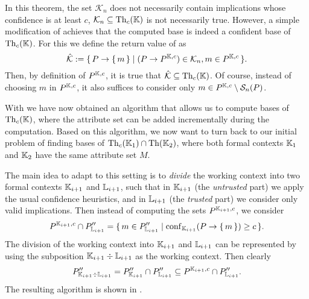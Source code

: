 In this theorem, the set $\mathcal{K}_{n}$ does not necessarily contain implications whose
confidence is at least $c$, \ie $\mathcal{K}_{n} \subseteq \operatorname{Th}_{c}({\mathbb{K}})$ is not
necessarily true.  However, a simple modification of
 achieves that the computed base is indeed a
confident base of $\operatorname{Th}_{c}({\mathbb{K}})$.  For this we define the return value of
 as
\begin{equation*}
  \hat{\mathcal{K}} := {\{\, P \to {\ensuremath{\{\,m\,\}}} \mid (P \to P^{{\mathbb{K}}, c}) \in \mathcal{K}_{n},
    m \in P^{{\mathbb{K}}, c} \,\}}.
\end{equation*}
Then, by definition of $P^{{\mathbb{K}}, c}$, it is true that $\hat{\mathcal{K}} \subseteq
\operatorname{Th}_{c}({\mathbb{K}})$.  Of course, instead of choosing $m$ in $P^{{\mathbb{K}}, c}$, it also suffices
to consider only $m \in P^{{\mathbb{K}}, c} \setminus \mathcal{S}_{n}(P)$.

With  we have now obtained an algorithm that
allows us to compute bases of $\operatorname{Th}_{c}({\mathbb{K}})$, where the attribute set can be added
incrementally during the computation.  Based on this algorithm, we now want to turn back
to our initial problem of finding bases of $\operatorname{Th}_{c}({\mathbb{K}}_{1}) \cap \operatorname{Th}({\mathbb{K}}_{2})$,
where both formal contexts ${\mathbb{K}}_{1}$ and ${\mathbb{K}}_{2}$ have the same attribute set $M$.

The main idea to adapt  to this setting is to
\emph{divide} the working context into two formal contexts ${\mathbb{K}}_{i+1}$ and ${\mathbb{L}}_{i+1}$, such that in ${\mathbb{K}}_{i+1}$ (the \emph{untrusted} part) we apply the usual
confidence heuristics, and in ${\mathbb{L}}_{i+1}$ (the \emph{trusted} part) we consider only
valid implications.  Then instead of computing the sets $P^{{\mathbb{K}}_{i+1}, c}$, we consider
\begin{equation*}
  P^{{\mathbb{K}}_{i+1}, c} \cap P_{{\mathbb{L}}_{i+1}}'' = {\{\, m \in P_{{\mathbb{L}}_{i+1}}'' \mid
    \operatorname{conf}_{{\mathbb{K}}_{i+1}}(P \to {\ensuremath{\{\,m\,\}}}) \ge c \,\}}.
\end{equation*}
The division of the working context into ${\mathbb{K}}_{i+1}$ and ${\mathbb{L}}_{i+1}$ can be
represented by using the subposition ${\mathbb{K}}_{i+1} \div {\ensuremath{\mathbb{L}}}_{i+1}$ as the working
context.  Then clearly
\begin{equation}
  \label{eq:54}
  P_{{\mathbb{K}}_{i+1} \div {\ensuremath{\mathbb{L}}}_{i+1}}'' = P_{{\mathbb{K}}_{i+1}}'' \cap P_{{\mathbb{L}}_{i+1}}''
  \subseteq P^{{\mathbb{K}}_{i+1}, c} \cap P_{{\mathbb{L}}_{i+1}}''.
\end{equation}
The resulting algorithm is shown in
.

